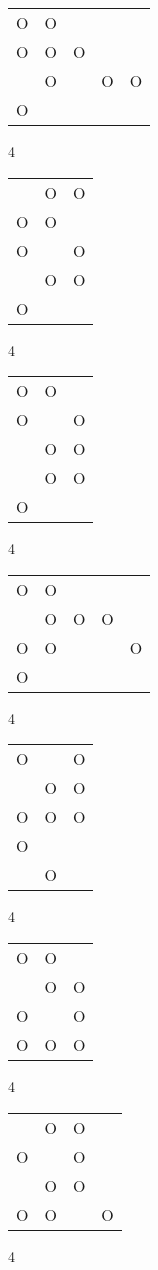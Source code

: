 \begin{tabular}{|m{0.2cm}m{0.2cm}m{0.2cm}m{0.2cm}m{0.2cm}|}\hline
O&O& & & \\
O&O&O& & \\
 &O& &O&O\\
O& & & & \\
\hline\end{tabular}4
\begin{tabular}{|m{0.2cm}m{0.2cm}m{0.2cm}|}\hline
 &O&O\\
O&O& \\
O& &O\\
 &O&O\\
O& & \\
\hline\end{tabular}4
\begin{tabular}{|m{0.2cm}m{0.2cm}m{0.2cm}|}\hline
O&O& \\
O& &O\\
 &O&O\\
 &O&O\\
O& & \\
\hline\end{tabular}4
\begin{tabular}{|m{0.2cm}m{0.2cm}m{0.2cm}m{0.2cm}m{0.2cm}|}\hline
O&O& & & \\
 &O&O&O& \\
O&O& & &O\\
O& & & & \\
\hline\end{tabular}4
\begin{tabular}{|m{0.2cm}m{0.2cm}m{0.2cm}|}\hline
O& &O\\
 &O&O\\
O&O&O\\
O& & \\
 &O& \\
\hline\end{tabular}4
\begin{tabular}{|m{0.2cm}m{0.2cm}m{0.2cm}|}\hline
O&O& \\
 &O&O\\
O& &O\\
O&O&O\\
\hline\end{tabular}4
\begin{tabular}{|m{0.2cm}m{0.2cm}m{0.2cm}m{0.2cm}|}\hline
 &O&O& \\
O& &O& \\
 &O&O& \\
O&O& &O\\
\hline\end{tabular}4

